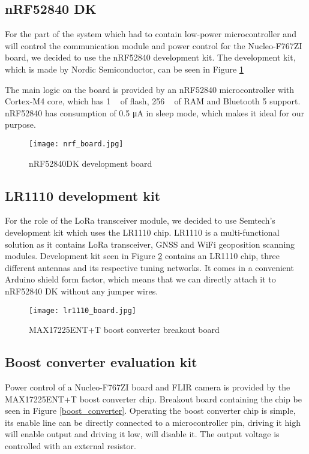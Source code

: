 \subsection{ nRF52840 DK}

For the part of the system which had to contain low-power microcontroller and will control the communication module and power control for the Nucleo-F767ZI board,  we decided to use the nRF52840 development kit.
The development kit, which is made by Nordic Semiconductor, can be seen in Figure \ref{nrf_board}

The main logic on the board is provided by an nRF52840 microcontroller with Cortex-M4 core, which has 1 \si{\mega\byte} of flash, 256 \si{\kilo\byte} of RAM and Bluetooth 5 support.
nRF52840 has consumption of 0.5 \si{\micro\ampere} in sleep mode, which makes it ideal for our purpose.

\begin{figure}[ht]
        \centering
        \texttt{[image: nrf\_board.jpg]} 
        \caption{ nRF52840DK development board}
        \label{nrf_board}
\end{figure}

\subsection{ LR1110 development kit}

For the role of the LoRa transceiver module, we decided to use Semtech's development kit which uses the LR1110 chip.
LR1110 is a multi-functional solution as it contains LoRa transceiver, GNSS and WiFi geoposition scanning modules.
Development kit seen in Figure \ref{lr1110_board} contains an LR1110 chip, three different antennas and its respective tuning networks.
It comes in a convenient Arduino shield form factor, which means that we can directly attach it to nRF52840 DK without any jumper wires.

\begin{figure}[ht]
        \centering
        \texttt{[image: lr1110\_board.jpg]} 
        \caption{ MAX17225ENT+T boost converter breakout board}
        \label{lr1110_board}
\end{figure}

\subsection{ Boost converter evaluation kit}

Power control of a Nucleo-F767ZI board and FLIR camera is provided by the MAX17225ENT+T boost converter chip.
Breakout board containing the chip be seen in Figure \ref{boost_converter}.
Operating the boost converter chip is simple, its enable line can be directly connected to a microcontroller pin, driving it high will enable output and driving it low, will disable it.
The output voltage is controlled with an external resistor.

